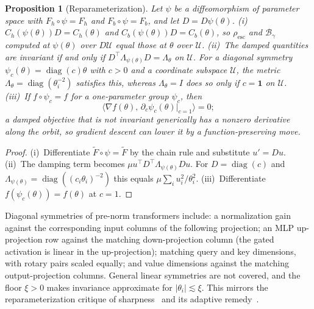 \documentclass[11pt]{article}
\newtheorem{proposition}{Proposition}
\newcommand{\Resc}{\rho_{\mathrm{esc}}}
\newcommand{\Barrier}{\mathcal{B}}
\newcommand{\U}{\mathcal{U}}
\newcommand{\Lam}{\Lambda_{\theta}}
\newcommand{\Ft}{\widetilde{F}}
\newcommand{\Ch}{C_{h}}
\newcommand{\Cb}{C_{b}}
\newcommand{\diag}{\operatorname{diag}}
\begin{document}
\begin{proposition}[Reparameterization]
\label{prop:reparam}
Let $\psi$ be a diffeomorphism of parameter space with $F_h\circ\psi=F_h$ and $F_b\circ\psi=F_b$, and let $D=D\psi(\theta)$.
(i)~$\Ch(\psi(\theta))D=\Ch(\theta)$ and $\Cb(\psi(\theta))D=\Cb(\theta)$, so $\Resc$ and $\Barrier_\gamma$ computed at $\psi(\theta)$ over $D\U$ equal those at $\theta$ over $\U$.
(ii)~The damped quantities are invariant if and only if $D^\top\Lambda_{\psi(\theta)}D=\Lam$ on $\U$. For a diagonal symmetry $\psi_c(\theta)=\diag(c)\theta$ with $c>0$ and a coordinate subspace $\U$, the metric $\Lam=\diag(\theta_i^{-2})$ satisfies this, whereas $\Lam=I$ does so only if $c=\mathbf 1$ on $\U$.
(iii)~If $f\circ\psi_c=f$ for a one-parameter group $\psi_c$, then
\begin{equation*}
\bigl\langle\nabla f(\theta),\,\partial_c\psi_c(\theta)|_{c=1}\bigr\rangle=0 ;
\end{equation*}
a damped objective that is not invariant generically has a nonzero derivative along the orbit, so gradient descent can lower it by a function-preserving move.
\end{proposition}
\begin{proof}
(i)~Differentiate $\Ft\circ\psi=\Ft$ by the chain rule and substitute $u'=Du$.
(ii)~The damping term becomes $\mu u^\top D^\top\Lambda_{\psi(\theta)}Du$. For $D=\diag(c)$ and $\Lambda_{\psi(\theta)}=\diag((c_i\theta_i)^{-2})$ this equals $\mu\sum_iu_i^2/\theta_i^2$.
(iii)~Differentiate $f(\psi_c(\theta))=f(\theta)$ at $c=1$.
\end{proof}
Diagonal symmetries of pre-norm transformers include: a normalization gain against the corresponding input columns of the following projection; an MLP up-projection row against the matching down-projection column (the gated activation is linear in the up-projection); matching query and key dimensions, with rotary pairs scaled equally; and value dimensions against the matching output-projection columns. General linear symmetries are not covered, and the floor $\xi>0$ makes invariance approximate for $|\theta_i|\lesssim\xi$. This mirrors the reparameterization critique of sharpness~\citep{dinh2017sharp} and its adaptive remedy~\citep{kwon2021asam}.
\end{document}
